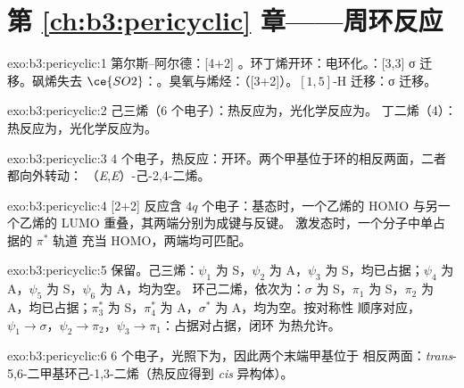 \section*{第 \ref{ch:b3:pericyclic} 章——周环反应}

\begin{solution}{exo:b3:pericyclic:1}
第尔斯–阿尔德：[4+2] 。环丁烯开环：电环化。：[3,3]
σ 迁移。砜烯失去 $\ce{SO2}$：。臭氧与烯烃：（[3+2]）。$[1,5]$-H 迁移：σ 迁移。
\end{solution}

\begin{solution}{exo:b3:pericyclic:2}
己三烯（6 个电子）：热反应为，光化学反应为。
丁二烯（4）：热反应为，光化学反应为。
\end{solution}

\begin{solution}{exo:b3:pericyclic:3}
4 个电子，热反应：开环。两个甲基位于环的相反两面，二者都向外转动：
（\textit{E},\textit{E}）-己-2,4-二烯。
\end{solution}

\begin{solution}{exo:b3:pericyclic:4}
 [2+2] 反应含 $4q$ 个电子：基态时，一个乙烯的 HOMO 与另一个乙烯的 LUMO
重叠，其两端分别为成键与反键。
激发态时，一个分子中单占据的 $\pi^*$ 轨道
充当 HOMO，两端均可匹配。
\end{solution}

\begin{solution}{exo:b3:pericyclic:5}
保留。己三烯：$\psi_1$ 为 S，$\psi_2$ 为 A，$\psi_3$ 为 S，均已占据；$\psi_4$ 为 A，$\psi_5$ 为 S，$\psi_6$ 为 A，均为空。
环己二烯，依次为：$\sigma$ 为 S，$\pi_1$ 为 S，$\pi_2$ 为 A，均已占据；$\pi_3^*$ 为 S，$\pi_4^*$ 为 A，$\sigma^*$ 为 A，均为空。按对称性
顺序对应，$\psi_1 \to \sigma$，$\psi_2 \to \pi_2$，$\psi_3 \to \pi_1$：占据对占据，闭环
为热允许。
\end{solution}

\begin{solution}{exo:b3:pericyclic:6}
6 个电子，光照下为，因此两个末端甲基位于
相反两面：\textit{trans}-5,6-二甲基环己-1,3-二烯（热反应得到
\textit{cis} 异构体）。
\end{solution}

